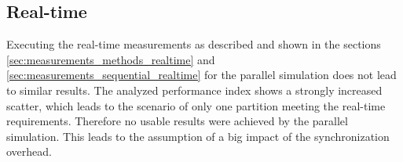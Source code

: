 \subsection{Real-time}
\label{sec:measurements_parallel_realtime}

Executing the real-time measurements as described and shown in the sections \ref{sec:measurements_methods_realtime} and \ref{sec:measurements_sequential_realtime} for the parallel simulation does not lead to similar results.
The analyzed performance index shows a strongly increased scatter, which leads to the scenario of only one partition meeting the real-time requirements.
Therefore no usable results were achieved by the parallel simulation.
This leads to the assumption of a big impact of the synchronization overhead.

